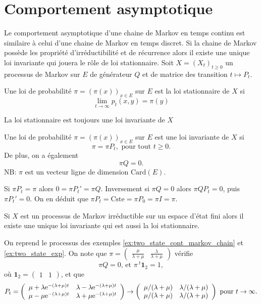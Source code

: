 \section{Comportement asymptotique}\label{sec:asymptotic_behavior}
Le comportement asymptotique d'une chaine de Markov en temps continu est similaire à celui d'une chaine de Markov en temps discret. Si la chaine de Markov possède les propriété d'irréductibilité et de récurrence alors il existe une unique loi invariante qui jouera le rôle de loi stationnaire. Soit $X=(X_t)_{t\geq 0}$ un processus de Markov sur $E$ de générateur $Q$ et de matrice des transition $t\mapsto P_t$.
\begin{definition}
Une loi de probabilité $\pi = (\pi(x))_{x\in E}$ sur $E$ est la loi stationnaire de $X$ si 
$$
\underset{t\rightarrow \infty}{\lim} p_t(x,y) = \pi(y)
$$
\end{definition}
La loi stationnaire est toujours une loi invariante de $X$
\begin{definition}
Une loi de probabilité $\pi = (\pi(x))_{x\in E}$ sur $E$ est une loi invariante de $X$ si 
$$
\pi = \pi P_t,\text{ pour tout }t\geq0.
$$
De plus, on a également 
$$
\pi Q = 0.
$$
NB: $\pi$ est un vecteur ligne de dimension $\text{Card}(E)$.
\end{definition}
Si $\pi P_t = \pi$ alors $0 = \pi P_t' = \pi Q$. Inversement si $\pi Q = 0$ alors $\pi Q P_t = 0$, puis $\pi P_t' = 0$. On en déduit que $\pi P_t = \text{Cste} = \pi P_0  = \pi I =  \pi$.
\begin{theo}
Si $X$ est un processus de Markov irréductible sur un espace d'état fini alors il existe une unique loi invariante qui est aussi la loi stationnaire.
\end{theo}
\begin{ex}
On reprend le processus des exemples \ref{ex:two_state_cont_markov_chain} et \ref{ex:two_state_exp}. On note que $\pi = \left(\begin{array}{cc}\frac{\mu}{\lambda +\mu} & \frac{\lambda}{\lambda +\mu}\end{array}\right)$ vérifie  
$$
\pi Q = 0\text{, et }\pi \,^t\mathbf{1}_2 = 1, 
$$
où $\mathbf{1}_2 = \left(\begin{array}{cc}1&1\end{array}\right)$, et que 
\begin{equation}\label{eq:transition_matrix_subordinated_poisson}
P_t = 
\left(\begin{array}{cc}
\mu +\lambda \mathrm{e}^{-(\lambda +\mu)t}&\lambda -\lambda \mathrm{e}^{-(\lambda +\mu)t}\\
\mu -\mu \mathrm{e}^{-(\lambda +\mu)t}&\lambda +\mu \mathrm{e}^{-(\lambda +\mu)t}\\
\end{array}\right)
\rightarrow
\left(\begin{array}{cc}
\mu / (\lambda + \mu)&\lambda/(\lambda + \mu)\\
\mu /(\lambda + \mu)&\lambda/(\lambda + \mu)\\
\end{array}\right)\text{ pour }t\rightarrow \infty.
\end{equation}
\end{ex}
